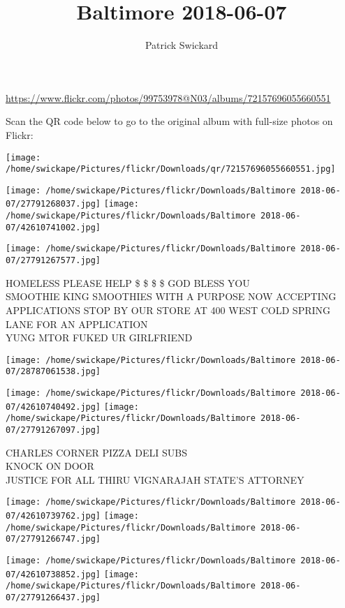 \documentclass[10pt,letterpaper]{article}
\title{Baltimore 2018-06-07}
\author{Patrick Swickard}
\date{}
\begin{document}
\maketitle

\url{https://www.flickr.com/photos/99753978@N03/albums/72157696055660551}

Scan the QR code below to go to the original album with full-size photos on Flickr:

\texttt{[image: /home/swickape/Pictures/flickr/Downloads/qr/72157696055660551.jpg]}
\pagebreak

\texttt{[image: /home/swickape/Pictures/flickr/Downloads/Baltimore 2018-06-07/27791268037.jpg]}
\texttt{[image: /home/swickape/Pictures/flickr/Downloads/Baltimore 2018-06-07/42610741002.jpg]}

\texttt{[image: /home/swickape/Pictures/flickr/Downloads/Baltimore 2018-06-07/27791267577.jpg]}

HOMELESS PLEASE HELP \$ \$ \$ \$ GOD BLESS YOU\\
SMOOTHIE KING SMOOTHIES WITH A PURPOSE NOW ACCEPTING APPLICATIONS STOP BY OUR STORE AT 400 WEST COLD SPRING LANE FOR AN APPLICATION\\
YUNG MTOR FUKED UR GIRLFRIEND
\pagebreak

\texttt{[image: /home/swickape/Pictures/flickr/Downloads/Baltimore 2018-06-07/28787061538.jpg]}

\vspace{0.25in}
\texttt{[image: /home/swickape/Pictures/flickr/Downloads/Baltimore 2018-06-07/42610740492.jpg]}
\texttt{[image: /home/swickape/Pictures/flickr/Downloads/Baltimore 2018-06-07/27791267097.jpg]}

CHARLES CORNER PIZZA DELI SUBS\\
KNOCK ON DOOR\\
JUSTICE FOR ALL THIRU VIGNARAJAH STATE'S ATTORNEY
\pagebreak

\texttt{[image: /home/swickape/Pictures/flickr/Downloads/Baltimore 2018-06-07/42610739762.jpg]}
\texttt{[image: /home/swickape/Pictures/flickr/Downloads/Baltimore 2018-06-07/27791266747.jpg]}

\texttt{[image: /home/swickape/Pictures/flickr/Downloads/Baltimore 2018-06-07/42610738852.jpg]}
\texttt{[image: /home/swickape/Pictures/flickr/Downloads/Baltimore 2018-06-07/27791266437.jpg]}
\end{document}
